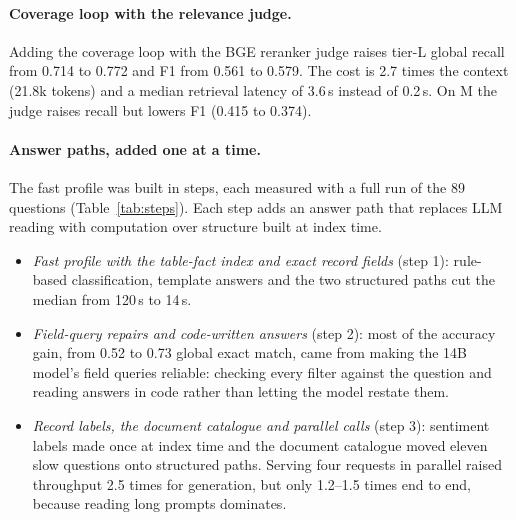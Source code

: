 \documentclass[11pt,letterpaper,oneside]{report}
\begin{document}
\paragraph{Coverage loop with the relevance judge.}
Adding the coverage loop with the BGE reranker judge raises tier-L global
recall from 0.714 to 0.772 and F1 from 0.561 to 0.579. The cost is 2.7 times
the context (21.8k tokens) and a median retrieval latency of 3.6\,s instead
of 0.2\,s. On M the judge raises recall but lowers F1 (0.415 to 0.374).

\paragraph{Answer paths, added one at a time.}
The fast profile was built in steps, each measured with a full run of the 89
questions (Table~\ref{tab:steps}). Each step adds an answer path that
replaces LLM reading with computation over structure built at index time.
\begin{itemize}
  \item \emph{Fast profile with the table-fact index and exact record fields}
  (step 1): rule-based classification, template answers and the two
  structured paths cut the median from 120\,s to 14\,s.
  \item \emph{Field-query repairs and code-written answers} (step 2): most of
  the accuracy gain, from 0.52 to 0.73 global exact match, came from making
  the 14B model's field queries reliable: checking every filter against the
  question and reading answers in code rather than letting the model restate
  them.
  \item \emph{Record labels, the document catalogue and parallel calls}
  (step 3): sentiment labels made once at index time and the document
  catalogue moved eleven slow questions onto structured paths. Serving four
  requests in parallel raised throughput 2.5 times for generation, but only
  1.2--1.5 times end to end, because reading long prompts dominates.
\end{itemize}

\begin{table}[htbp]
\centering\small
\caption{The fast profile built in steps (tier L, Qwen2.5-14B only). Every
row is a full run of the 89 questions.}
\label{tab:steps}
\end{table}
\end{document}
